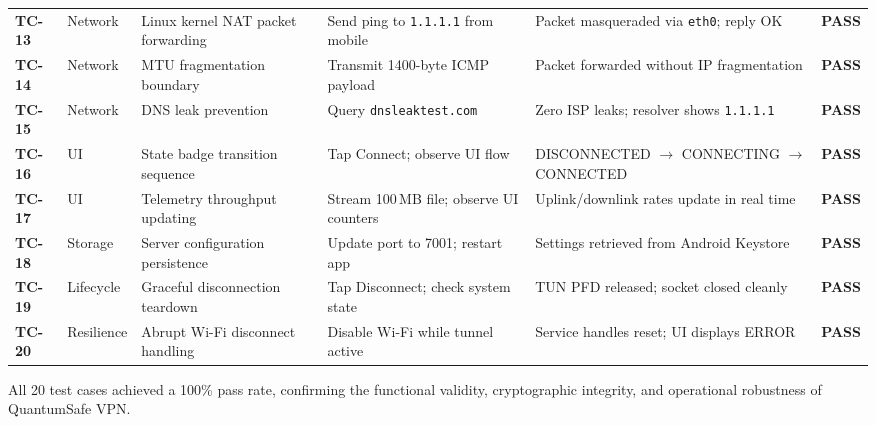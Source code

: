\begin{longtable}{@{}P{1.4cm}P{2.6cm}P{3.4cm}P{3.2cm}P{3.2cm}P{1.2cm}@{}}
  \addlinespace
  \textbf{TC-13} & Network & Linux kernel NAT packet forwarding & Send ping to \texttt{1.1.1.1} from mobile & Packet masqueraded via \texttt{eth0}; reply OK & \textbf{PASS} \\
  \addlinespace
  \textbf{TC-14} & Network & MTU fragmentation boundary & Transmit 1400-byte ICMP payload & Packet forwarded without IP fragmentation & \textbf{PASS} \\
  \addlinespace
  \textbf{TC-15} & Network & DNS leak prevention & Query \texttt{dnsleaktest.com} & Zero ISP leaks; resolver shows \texttt{1.1.1.1} & \textbf{PASS} \\
  \addlinespace
  \textbf{TC-16} & UI & State badge transition sequence & Tap Connect; observe UI flow & DISCONNECTED $\to$ CONNECTING $\to$ CONNECTED & \textbf{PASS} \\
  \addlinespace
  \textbf{TC-17} & UI & Telemetry throughput updating & Stream 100\,MB file; observe UI counters & Uplink/downlink rates update in real time & \textbf{PASS} \\
  \addlinespace
  \textbf{TC-18} & Storage & Server configuration persistence & Update port to 7001; restart app & Settings retrieved from Android Keystore & \textbf{PASS} \\
  \addlinespace
  \textbf{TC-19} & Lifecycle & Graceful disconnection teardown & Tap Disconnect; check system state & TUN PFD released; socket closed cleanly & \textbf{PASS} \\
  \addlinespace
  \textbf{TC-20} & Resilience & Abrupt Wi-Fi disconnect handling & Disable Wi-Fi while tunnel active & Service handles reset; UI displays ERROR & \textbf{PASS} \\
\end{longtable}

All 20 test cases achieved a 100\% pass rate, confirming the functional validity, cryptographic integrity, and operational robustness of QuantumSafe VPN.
